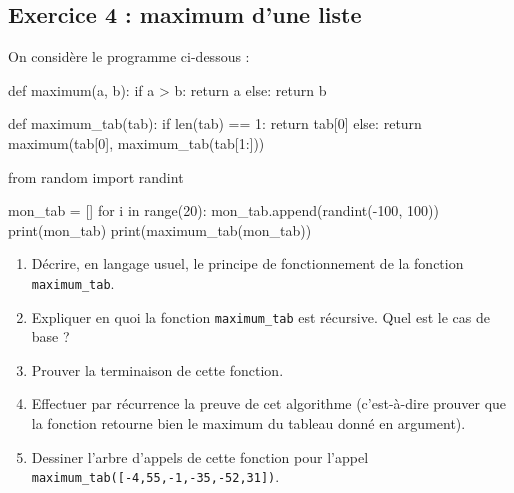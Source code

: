 \documentclass[
  letterpaper,
  DIV=11,
  numbers=noendperiod]{scrartcl}
\newenvironment{Shaded}{\begin{snugshade}}{\end{snugshade}}
\newcommand{\BuiltInTok}[1]{\textcolor[rgb]{0.00,0.23,0.31}{#1}}
\newcommand{\ControlFlowTok}[1]{\textcolor[rgb]{0.00,0.23,0.31}{#1}}
\newcommand{\DecValTok}[1]{\textcolor[rgb]{0.68,0.00,0.00}{#1}}
\newcommand{\ImportTok}[1]{\textcolor[rgb]{0.00,0.46,0.62}{#1}}
\newcommand{\KeywordTok}[1]{\textcolor[rgb]{0.00,0.23,0.31}{#1}}
\newcommand{\NormalTok}[1]{\textcolor[rgb]{0.00,0.23,0.31}{#1}}
\newcommand{\OperatorTok}[1]{\textcolor[rgb]{0.37,0.37,0.37}{#1}}
\providecommand{\tightlist}{%
  \setlength{\itemsep}{0pt}\setlength{\parskip}{0pt}}\usepackage{longtable,booktabs,array}
\begin{document}
\hypertarget{fa-solid-pencil-alt-exercice-4-maximum-dune-liste}{%
\subsection{\texorpdfstring{ Exercice 4 : maximum
d'une
liste}{ Exercice 4 : maximum d'une liste}}\label{fa-solid-pencil-alt-exercice-4-maximum-dune-liste}}

On considère le programme ci-dessous :

\begin{Shaded}
\begin{Highlighting}[]
\KeywordTok{def}\NormalTok{ maximum(a, b):}
    \ControlFlowTok{if}\NormalTok{ a }\OperatorTok{\textgreater{}}\NormalTok{ b:}
        \ControlFlowTok{return}\NormalTok{ a}
    \ControlFlowTok{else}\NormalTok{:}
        \ControlFlowTok{return}\NormalTok{ b}

\KeywordTok{def}\NormalTok{ maximum\_tab(tab):}
    \ControlFlowTok{if} \BuiltInTok{len}\NormalTok{(tab) }\OperatorTok{==} \DecValTok{1}\NormalTok{:}
        \ControlFlowTok{return}\NormalTok{ tab[}\DecValTok{0}\NormalTok{]}
    \ControlFlowTok{else}\NormalTok{:}
        \ControlFlowTok{return}\NormalTok{ maximum(tab[}\DecValTok{0}\NormalTok{], maximum\_tab(tab[}\DecValTok{1}\NormalTok{:]))}

\ImportTok{from}\NormalTok{ random }\ImportTok{import}\NormalTok{ randint}

\NormalTok{mon\_tab }\OperatorTok{=}\NormalTok{ []}
\ControlFlowTok{for}\NormalTok{ i }\KeywordTok{in} \BuiltInTok{range}\NormalTok{(}\DecValTok{20}\NormalTok{):}
\NormalTok{    mon\_tab.append(randint(}\OperatorTok{{-}}\DecValTok{100}\NormalTok{, }\DecValTok{100}\NormalTok{))}
\BuiltInTok{print}\NormalTok{(mon\_tab)}
\BuiltInTok{print}\NormalTok{(maximum\_tab(mon\_tab))}
\end{Highlighting}
\end{Shaded}

\begin{enumerate}
\def\labelenumi{\arabic{enumi}.}
\tightlist
\item
  Décrire, en langage usuel, le principe de fonctionnement de la
  fonction \texttt{maximum\_tab}.
\item
  Expliquer en quoi la fonction \texttt{maximum\_tab} est récursive.
  Quel est le cas de base ?
\item
  Prouver la terminaison de cette fonction.
\item
  Effectuer par récurrence la preuve de cet algorithme (c'est-à-dire
  prouver que la fonction retourne bien le maximum du tableau donné en
  argument).
\item
  Dessiner l'arbre d'appels de cette fonction pour l'appel
  \texttt{maximum\_tab({[}-4,55,-1,-35,-52,31{]})}.
\end{enumerate}
\end{document}
